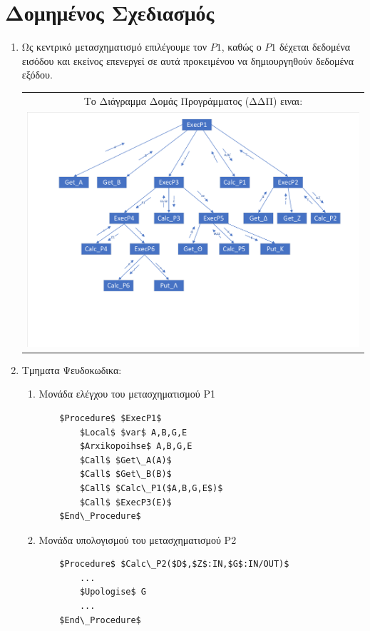 \documentclass[12pt]{article}
\begin{document}
\newpage
\section{Δομημένος Σχεδιασμός}
\begin{enumerate}

\item Ως κεντρικό μετασχηματισμό επιλέγουμε τον $P1$, καθώς ο $P1$ 
δέχεται δεδομένα εισόδου και εκείνος επενεργεί σε αυτά προκειμένου να δημιουργηθούν δεδομένα εξόδου.\\
\begin{center}
\begin{tabular}{c}
Το Διάγραμμα Δομάς Προγράμματος (ΔΔΠ) ειναι:\\
\includegraphics[scale=0.5]{MerosG/DDP}
\end{tabular}
\end{center}

\newpage
\item Τμηματα Ψευδοκωδικα:
\begin{enumerate}[label*=\roman*]
	\item Mονάδα ελέγχου του μετασχηματισμού Ρ1
	
	\begin{lstlisting}
	$Procedure$ $ExecP1$
		$Local$ $var$ A,B,G,E
		$Arxikopoihse$ A,B,G,E
		$Call$ $Get\_A(A)$
		$Call$ $Get\_B(B)$
		$Call$ $Calc\_P1($A,B,G,E$)$
		$Call$ $ExecP3(E)$
	$End\_Procedure$
	\end{lstlisting}
	
	\item  Μονάδα υπολογισμού του μετασχηματισμού Ρ2
	\begin{lstlisting}
	$Procedure$ $Calc\_P2($D$,$Z$:IN,$G$:IN/OUT)$
		...
		$Upologise$ G
		...
	$End\_Procedure$
	\end{lstlisting}
	

\end{enumerate}
\end{enumerate}
\end{document}
